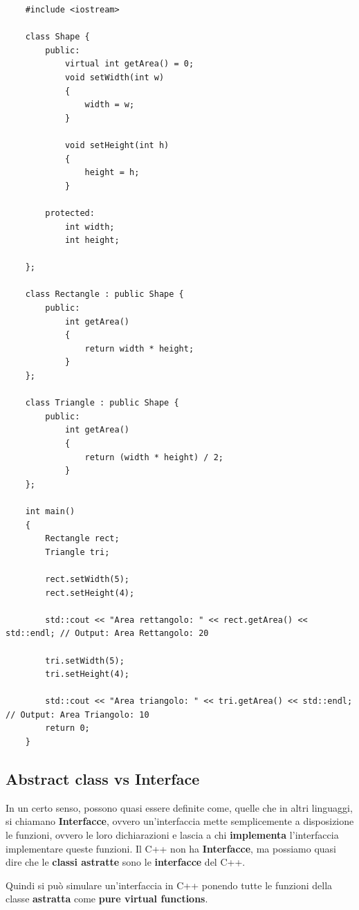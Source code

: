 \begin{lstlisting}
	#include <iostream>
	
	class Shape {
		public:
			virtual int getArea() = 0;
			void setWidth(int w)
			{
				width = w;
			}
		
			void setHeight(int h)
			{
				height = h;
			}
		
		protected:
			int width;
			int height;
			
	};

	class Rectangle : public Shape {
		public:
			int getArea()
			{
				return width * height;
			}
	};

	class Triangle : public Shape {
		public:
			int getArea()
			{
				return (width * height) / 2;
			}
	};

	int main()
	{
		Rectangle rect;
		Triangle tri;
		
		rect.setWidth(5);
		rect.setHeight(4);
		
		std::cout << "Area rettangolo: " << rect.getArea() << std::endl; // Output: Area Rettangolo: 20
		
		tri.setWidth(5);
		tri.setHeight(4);
		
		std::cout << "Area triangolo: " << tri.getArea() << std::endl; // Output: Area Triangolo: 10
		return 0;
	}
\end{lstlisting}

\subsection{Abstract class vs Interface}

\textsf{\small In un certo senso, possono quasi essere definite come, quelle che in altri linguaggi, si chiamano \textbf{Interfacce}, ovvero un'interfaccia mette semplicemente a disposizione le funzioni, ovvero le loro dichiarazioni e lascia a chi \textbf{implementa} l'interfaccia implementare queste funzioni. Il C++ non ha \textbf{Interfacce}, ma possiamo quasi dire che le \textbf{classi astratte} sono le \textbf{interfacce} del C++.} \break

\textsf{\small Quindi si può simulare un'interfaccia in C++ ponendo tutte le funzioni della classe \textbf{astratta} come \textbf{pure virtual functions}.} \\



